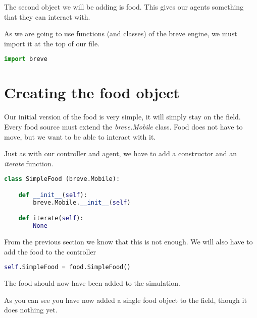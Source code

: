 The second object we will be adding is food. This gives our agents something that they can interact with.


As we are going to use functions (and classes) of the breve engine, we must import it at the top of our file.

\begin{lstlisting}[language=Python]
import breve
\end{lstlisting}


\section{Creating the food object}

Our initial version of the food is very simple, it will simply stay on the field. Every food source must extend the \textit{breve.Mobile} class. Food does not have to move, but we want to be able to interact with it.

Just as with our controller and agent, we have to add a constructor and an \textit{iterate} function.

\begin{lstlisting}[language=Python]
class SimpleFood (breve.Mobile):

    def __init__(self):
        breve.Mobile.__init__(self)

    def iterate(self):
        None
\end{lstlisting}


From the previous section we know that this is not enough. We will also have to add the food to the controller

\begin{lstlisting}[language=Python]
self.SimpleFood = food.SimpleFood()
\end{lstlisting}


The food should now have been added to the simulation.

As you can see you have now added a single food object to the field, though it does nothing yet.

